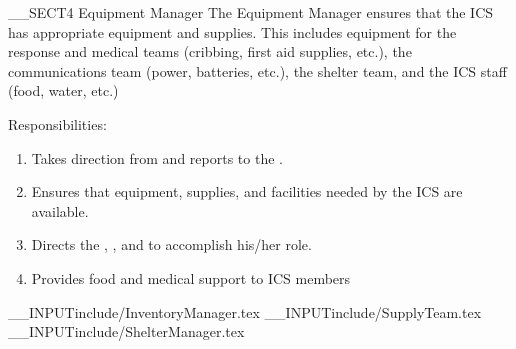 __SECT4{ \large Equipment Manager 
\label{sec:EquipmentManager} }
The Equipment Manager ensures that the ICS has 
appropriate equipment and supplies.
This includes equipment for the response and medical teams
(cribbing, first aid supplies, etc.),
the communications team (power, batteries, etc.),
the shelter team,
and the ICS staff (food, water, etc.)

Responsibilities:
\begin{enumerate}
\item Takes direction from and reports to the \LogisticsSectionChief.
\item Ensures that equipment, supplies, and facilities needed by the ICS are available.
\item Directs the \InventoryManager, \SupplyTeam, and \ShelterManager to accomplish his/her role.
\item Provides food and medical support to ICS members
\end{enumerate}

__INPUT{include/InventoryManager.tex}
__INPUT{include/SupplyTeam.tex}
__INPUT{include/ShelterManager.tex}

